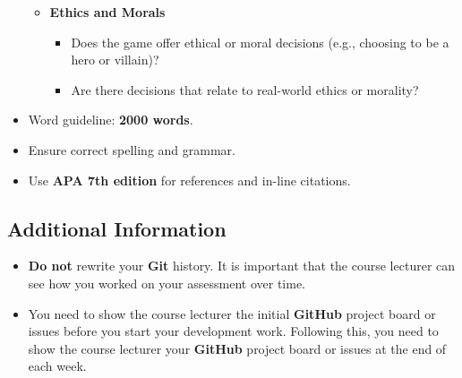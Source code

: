 \documentclass{article}
\begin{document}
\begin{itemize}
\begin{itemize}
		\item \textbf{Ethics and Morals}
		\begin{itemize}
			\item Does the game offer ethical or moral decisions (e.g., choosing to be a hero or villain)?
			\item Are there decisions that relate to real-world ethics or morality?
		\end{itemize}
	\end{itemize}
	
	\item Word guideline: \textbf{2000 words}.
	\item Ensure correct spelling and grammar.
	\item Use \textbf{APA 7th edition} for references and in-line citations.
	
\end{itemize}

\subsection*{Additional Information}
\begin{itemize}
    \item \textbf{Do not} rewrite your \textbf{Git} history. It is important that the course lecturer can see how you worked on your assessment over time. 
    \item You need to show the course lecturer the initial \textbf{GitHub} project board or issues before you start your development work. Following this, you need to show the course lecturer your \textbf{GitHub} project board or issues at the end of each week.
\end{itemize} 
\end{document}

